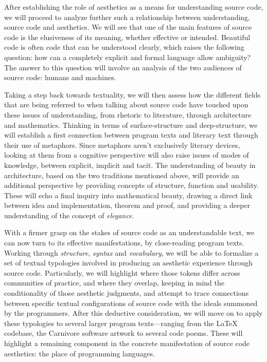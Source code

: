 After establishing the role of aesthetics as a means for understanding source code, we will proceed to analyze further such a relationship between understanding, source code and aesthetics. We will see that one of the main features of source code is the elusiveness of its meaning, whether effective or intended. Beautiful code is often code that can be understood clearly, which raises the following question: how can a completely explicit and formal language allow ambiguity? The answer to this question will involve an analysis of the two audiences of source code: humans and machines.

Taking a step back towards textuality, we will then assess how the different fields that are being referred to when talking about source code have touched upon these issues of understanding, from rhetoric to literature, through architecture and mathematics. Thinking in terms of surface-structure and deep-structure, we will establish a first connection between program texts and literary text through their use of metaphors. Since metaphors aren't exclusively literary devices, looking at them from a cognitive perspective will also raise issues of modes of knowledge, between explicit, implicit and tacit. The understanding of beauty in architecture, based on the two traditions mentioned above, will provide an additional perspective by providing concepts of structure, function and usability. These will echo a final inquiry into mathematical beauty, drawing a direct link between idea and implementation, theorem and proof, and providing a deeper understanding of the concept of \emph{elegance}.

With a firmer grasp on the stakes of source code as an understandable text, we can now turn to its effective manifestations, by close-reading program texts. Working through \emph{structure}, \emph{syntax} and \emph{vocabulary}, we will be able to formalize a set of textual typologies involved in producing an aesthetic experience through source code. Particularly, we will highlight where those tokens differ across communities of practice, and where they overlap, keeping in mind the conditionality of those aesthetic judgments, and attempt to trace connections between specific textual configurations of source code with the ideals summoned by the programmers. After this deductive consideration, we will move on to apply these typologies to several larger program texts—ranging from the LaTeX codebase, the Carnivore software artwork to several code poems. These will highlight a remaining component in the concrete manifestation of source code aesthetics: the place of programming languages.

